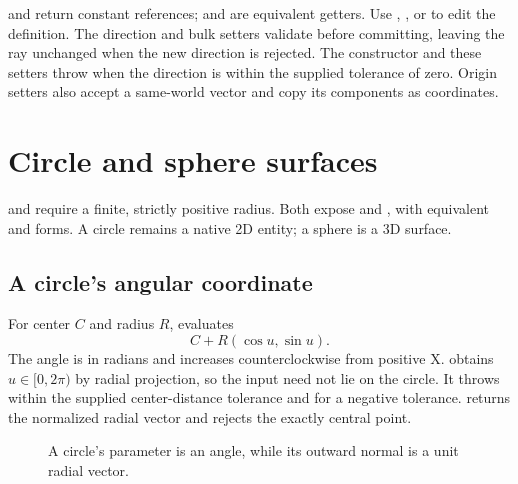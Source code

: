  and  return constant references;
 and  are equivalent getters.
Use , , or
 to edit the definition. The direction and
bulk setters validate before committing, leaving the ray unchanged when the
new direction is rejected. The constructor and these setters throw
 when the direction is within the supplied
tolerance of zero. Origin setters also accept a same-world vector and copy
its components as coordinates.

\section{Circle and sphere surfaces}

 and  require a
finite, strictly positive radius. Both expose  and
, with equivalent  and 
forms. A circle remains a native 2D entity; a sphere is a 3D surface.

\subsection{A circle's angular coordinate}

For center $C$ and radius $R$,  evaluates
\[
 C+R(\cos u,\sin u).
\]
The angle is in radians and increases counterclockwise from positive X.
 obtains $u\in[0,2\pi)$ by radial
projection, so the input need not lie on the circle. It throws
 within the supplied center-distance tolerance and
 for a negative tolerance.
 returns the normalized radial vector and rejects
the exactly central point.

\begin{figure}[htbp]
\centering
{}
\caption{A circle's parameter is an angle, while its outward normal is a
unit radial vector.}
\end{figure}

